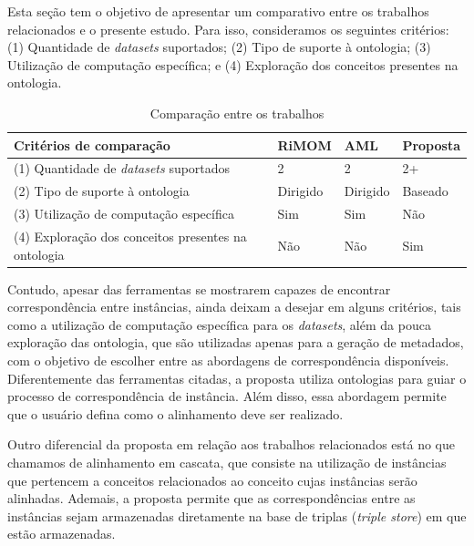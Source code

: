 Esta seção tem o objetivo de apresentar um comparativo entre os trabalhos relacionados e o presente estudo. Para isso, consideramos os seguintes critérios: (1) Quantidade de \textit{datasets} suportados; (2) Tipo de suporte à ontologia; (3) Utilização de computação específica; e (4) Exploração dos conceitos presentes na ontologia.

\begin{table}[h]
	\centering
	\caption{Comparação entre os trabalhos}
	\label{tab:comparacao}
	\begin{tabular}{@{}llll}
		\toprule
		\textbf{Critérios de comparação}                    & \textbf{RiMOM} & \textbf{AML} & \textbf{Proposta} \\ \midrule
		(1) Quantidade de \textit{datasets} suportados    & 2              & 2            & 2+                \\
		(2) Tipo de suporte à ontologia                     & Dirigido       & Dirigido     & Baseado           \\
		(3) Utilização de computação específica             & Sim            & Sim          & Não               \\
		(4) Exploração dos conceitos presentes na ontologia & Não            & Não          & Sim               \\ \bottomrule
	\end{tabular}
\end{table}

Contudo, apesar das ferramentas se mostrarem capazes de encontrar correspondência entre instâncias, ainda deixam a desejar em alguns critérios, tais como a utilização de computação específica para os \textit{datasets}, além da pouca exploração das ontologia, que são utilizadas apenas para a geração de metadados, com o objetivo de escolher entre as abordagens de correspondência disponíveis. Diferentemente das ferramentas citadas, a proposta utiliza ontologias para guiar o processo de correspondência de instância. Além disso, essa abordagem permite que o usuário defina como o alinhamento deve ser realizado.

Outro diferencial da proposta em relação aos trabalhos relacionados está no que chamamos de alinhamento em cascata, que consiste na utilização de instâncias que pertencem a conceitos relacionados ao conceito cujas instâncias serão alinhadas. Ademais, a proposta permite que as correspondências entre as instâncias sejam armazenadas diretamente na base de triplas (\textit{triple store}) em que estão armazenadas.